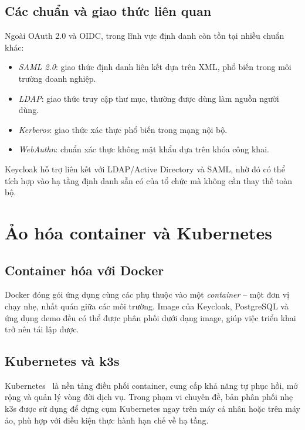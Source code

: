 \subsection{Các chuẩn và giao thức liên quan}
\label{subsec:related}

Ngoài OAuth 2.0 và OIDC, trong lĩnh vực định danh còn tồn tại nhiều chuẩn khác:

\begin{itemize}
  \item \textit{SAML 2.0}: giao thức định danh liên kết dựa trên XML, phổ biến
  trong môi trường doanh nghiệp.
  \item \textit{LDAP}: giao thức truy cập thư mục, thường được dùng làm nguồn
  người dùng.
  \item \textit{Kerberos}: giao thức xác thực phổ biến trong mạng nội bộ.
  \item \textit{WebAuthn}: chuẩn xác thực không mật khẩu dựa trên khóa công
  khai.
\end{itemize}

Keycloak hỗ trợ liên kết với LDAP/Active Directory và SAML, nhờ đó có thể tích
hợp vào hạ tầng định danh sẵn có của tổ chức mà không cần thay thế toàn bộ.

\section{Ảo hóa container và Kubernetes}
\label{sec:k8s}

\subsection{Container hóa với Docker}

Docker đóng gói ứng dụng cùng các phụ thuộc vào một \textit{container} -- một
đơn vị chạy nhẹ, nhất quán giữa các môi trường. Image của Keycloak, PostgreSQL
và ứng dụng demo đều có thể được phân phối dưới dạng image, giúp việc triển
khai trở nên tái lập được.

\subsection{Kubernetes và k3s}

Kubernetes~\cite{k8s} là nền tảng điều phối container, cung cấp khả năng tự
phục hồi, mở rộng và quản lý vòng đời dịch vụ. Trong phạm vi chuyên đề, bản
phân phối nhẹ k3s được sử dụng để dựng cụm Kubernetes ngay trên máy
cá nhân hoặc trên máy ảo, phù hợp với điều kiện thực hành hạn chế về hạ tầng.

